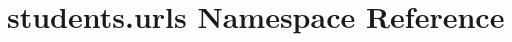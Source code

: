 \hypertarget{namespacestudents_1_1urls}{\section{students.\-urls Namespace Reference}
\label{namespacestudents_1_1urls}
}

